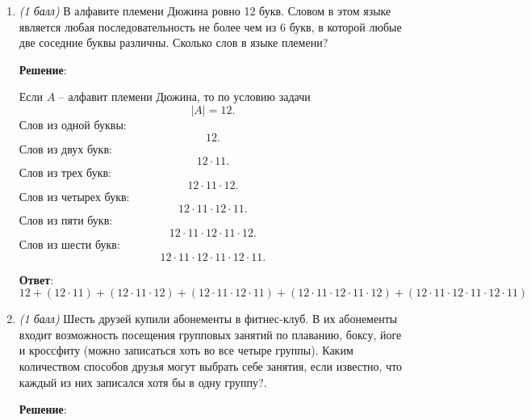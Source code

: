 \documentclass{article}
\begin{document}
    \begin{enumerate}
        \item \textit{(1 балл)} В алфавите племени Дюжина ровно 12 букв. Словом в этом языке является любая последовательность не более чем из 6 букв, в которой любые две соседние буквы различны. Сколько слов в языке племени?
        
        \textbf{Решение}:

        Если $A$ -- алфавит племени Дюжина, то по условию задачи
        \begin{equation}
            |A| = 12.            
        \end{equation}
        Слов из одной буквы:
        \begin{equation}
            12.
        \end{equation}
        Слов из двух букв:
        \begin{equation}
            12\cdot 11.
        \end{equation}
        Слов из трех букв:
        \begin{equation}
            12\cdot 11\cdot 12.
        \end{equation}
        Слов из четырех букв:
        \begin{equation}
            12\cdot 11\cdot 12\cdot 11.
        \end{equation}
        Слов из пяти букв:
        \begin{equation}
            12\cdot 11\cdot 12\cdot 11\cdot 12.
        \end{equation}
        Слов из шести букв:
        \begin{equation}
            12\cdot 11\cdot 12\cdot 11\cdot 12\cdot 11.
        \end{equation}

        \textbf{Ответ}:
        $12 + (12\cdot11) + (12\cdot11\cdot12) + (12\cdot11\cdot12\cdot11) + (12\cdot 11\cdot 12\cdot 11\cdot 12) + (12\cdot 11\cdot 12\cdot 11\cdot 12\cdot 11)$


        \item \textit{(1 балл)} Шесть друзей купили абонементы в фитнес-клуб. В их абонементы входит возможность посещения групповых занятий по плаванию, боксу, йоге и кроссфиту (можно записаться хоть во все четыре группы). Каким количеством способов друзья могут выбрать себе занятия, если известно, что каждый из них записался хотя бы в одну группу?.
        
        \textbf{Решение}:


\end{enumerate}
\end{document}
